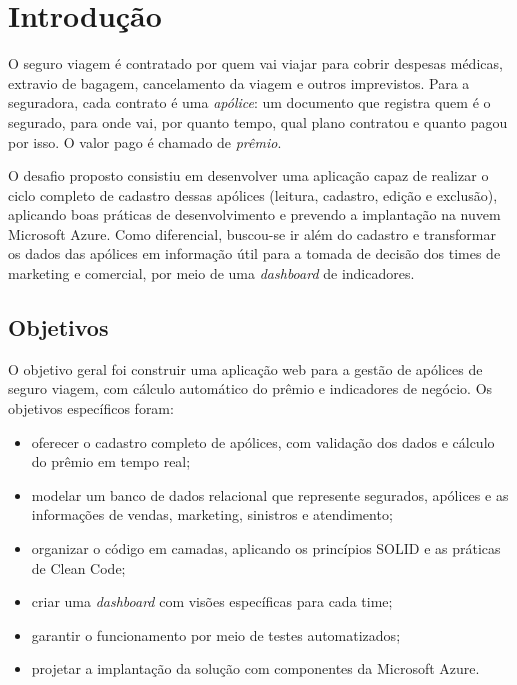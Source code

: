 \documentclass[12pt,a4paper]{article}
\begin{document}
\section{Introdução}

O seguro viagem é contratado por quem vai viajar para cobrir despesas médicas, extravio de
bagagem, cancelamento da viagem e outros imprevistos. Para a seguradora, cada contrato é uma
\emph{apólice}: um documento que registra quem é o segurado, para onde vai, por quanto tempo,
qual plano contratou e quanto pagou por isso. O valor pago é chamado de \emph{prêmio}.

O desafio proposto consistiu em desenvolver uma aplicação capaz de realizar o ciclo completo de
cadastro dessas apólices (leitura, cadastro, edição e exclusão), aplicando boas práticas de
desenvolvimento e prevendo a implantação na nuvem Microsoft Azure. Como diferencial, buscou-se
ir além do cadastro e transformar os dados das apólices em informação útil para a tomada de
decisão dos times de marketing e comercial, por meio de uma \emph{dashboard} de indicadores.

\subsection{Objetivos}

O objetivo geral foi construir uma aplicação web para a gestão de apólices de seguro viagem,
com cálculo automático do prêmio e indicadores de negócio. Os objetivos específicos foram:

\begin{itemize}
  \item oferecer o cadastro completo de apólices, com validação dos dados e cálculo do prêmio
        em tempo real;
  \item modelar um banco de dados relacional que represente segurados, apólices e as
        informações de vendas, marketing, sinistros e atendimento;
  \item organizar o código em camadas, aplicando os princípios SOLID e as práticas de Clean Code;
  \item criar uma \emph{dashboard} com visões específicas para cada time;
  \item garantir o funcionamento por meio de testes automatizados;
  \item projetar a implantação da solução com componentes da Microsoft Azure.
\end{itemize}
\end{document}
